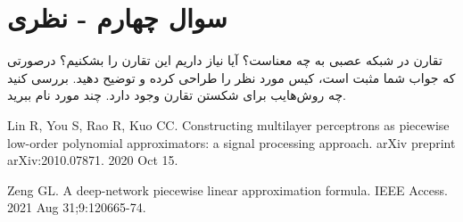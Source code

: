 \section{سوال چهارم - نظری}

تقارن در شبکه عصبی به چه معناست؟ آیا نیاز داریم این تقارن را بشکنیم؟ درصورتی که جواب شما مثبت است، کیس مورد نظر را طراحی کرده و توضیح دهید. بررسی کنید چه روش‌هایب برای شکستن تقارن وجود دارد. چند مورد نام ببرید.























\begin{latin}
	\begin{thebibliography}{9}
		Lin R, You S, Rao R, Kuo CC. Constructing multilayer perceptrons as piecewise low-order polynomial approximators: a signal processing approach. arXiv preprint arXiv:2010.07871. 2020 Oct 15.
		
		Zeng GL. A deep-network piecewise linear approximation formula. IEEE Access. 2021 Aug 31;9:120665-74.
	\end{thebibliography} 
\end{latin}